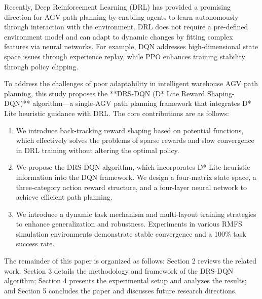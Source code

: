 Recently, Deep Reinforcement Learning (DRL) has provided a promising direction for AGV path planning by enabling agents to learn autonomously through interaction with the environment. DRL does not require a pre-defined environment model and can adapt to dynamic changes by fitting complex features via neural networks. For example, DQN addresses high-dimensional state space issues through experience replay, while PPO enhances training stability through policy clipping.

To address the challenges of poor adaptability in intelligent warehouse AGV path planning, this study proposes the **DRS-DQN (D* Lite Reward Shaping-DQN)** algorithm—a single-AGV path planning framework that integrates D* Lite heuristic guidance with DRL. The core contributions are as follows:
\begin{enumerate}
    \item We introduce back-tracking reward shaping based on potential functions, which effectively solves the problems of sparse rewards and slow convergence in DRL training without altering the optimal policy.
    \item We propose the DRS-DQN algorithm, which incorporates D* Lite heuristic information into the DQN framework. We design a four-matrix state space, a three-category action reward structure, and a four-layer neural network to achieve efficient path planning.
    \item We introduce a dynamic task mechanism and multi-layout training strategies to enhance generalization and robustness. Experiments in various RMFS simulation environments demonstrate stable convergence and a 100\% task success rate.
\end{enumerate}

The remainder of this paper is organized as follows: Section 2 reviews the related work; Section 3 details the methodology and framework of the DRS-DQN algorithm; Section 4 presents the experimental setup and analyzes the results; and Section 5 concludes the paper and discusses future research directions.